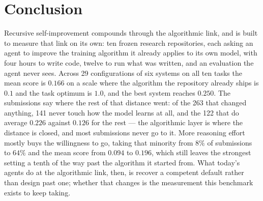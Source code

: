 \section{Conclusion}
\label{sec:conclusion}

Recursive self-improvement compounds through the algorithmic link, and \ai{} is built to measure that
link on its own: ten frozen research repositories, each asking an agent to improve the training
algorithm it already applies to its own model, with four hours to write code, twelve to run what was
written, and an evaluation the agent never sees. Across 29 configurations of six systems on all ten
tasks the mean score is $0.166$ on a scale where the algorithm the repository already ships is $0.1$
and the task optimum is $1.0$, and the best system reaches $0.250$. The submissions say where the
rest of that distance went: of the 263 that changed anything, 141 never touch how the model learns at
all, and the 122 that do average $0.226$ against $0.126$ for the rest --- the algorithmic layer is
where the distance is closed, and most submissions never go to it. More reasoning effort mostly buys
the willingness to go, taking that minority from $8\%$ of submissions to $64\%$ and the mean score
from $0.094$ to $0.196$, which still leaves the strongest setting a tenth of the way past the
algorithm it started from. What today's agents do at the algorithmic link, then, is recover a competent default
rather than design past one; whether that changes is the measurement this benchmark exists to keep
taking.
